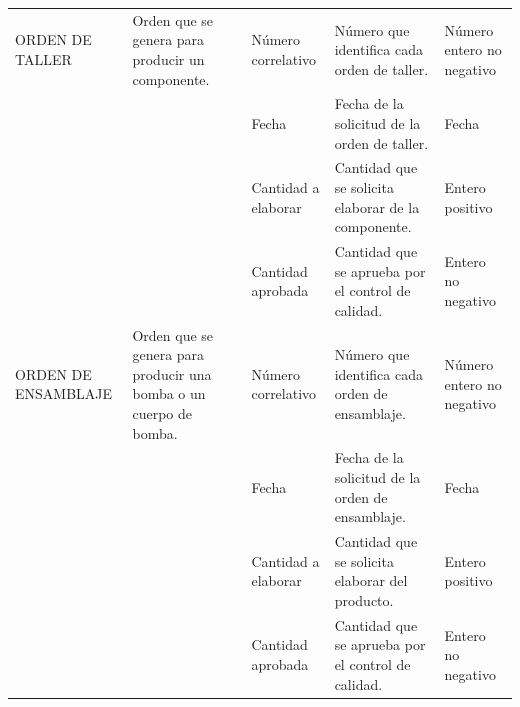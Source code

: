 \documentclass[]{report}
\begin{document}
\begin{center}
\begin{tabular}{ | p{2.5cm} | p{4.5cm} | p{2cm} | p{5cm} | p{3cm}|}
			ORDEN DE TALLER & Orden que se genera para producir un componente. &
			Número correlativo & Número que identifica cada orden de taller.& Número entero no negativo\\ \cline{3-5}
			&& Fecha & Fecha de la solicitud de la orden de taller.& Fecha\\ \cline{3-5}
			&& Cantidad a elaborar & Cantidad que se solicita elaborar de la componente.& Entero positivo\\ \cline{3-5}
			&& Cantidad aprobada & Cantidad que se aprueba por el control de calidad.& Entero no negativo\\ \cline{3-5}
			\hline
			
			ORDEN DE ENSAMBLAJE & Orden que se genera para producir una bomba o un cuerpo de bomba. &
			Número correlativo & Número que identifica cada orden de ensamblaje.& Número entero no negativo\\ \cline{3-5}
			&& Fecha & Fecha de la solicitud de la orden de ensamblaje.& Fecha\\ \cline{3-5}
			&& Cantidad a elaborar & Cantidad que se solicita elaborar del producto.& Entero positivo\\ \cline{3-5}
			&& Cantidad aprobada & Cantidad que se aprueba por el control de calidad.& Entero no negativo\\ \cline{3-5}
			\hline
			
	
		\end{tabular}
	\end{center}	
\end{document}
